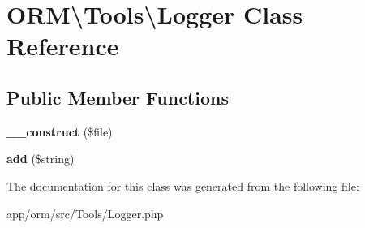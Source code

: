 \hypertarget{classORM_1_1Tools_1_1Logger}{}\section{O\+RM\textbackslash{}Tools\textbackslash{}Logger Class Reference}
\label{classORM_1_1Tools_1_1Logger}
\subsection*{Public Member Functions}
\begin{DoxyCompactItemize}
\item 
{\bfseries \+\_\+\+\_\+construct} (\$file)\hypertarget{classORM_1_1Tools_1_1Logger_aec350111b1a1558fc901226051b26ac7}{}\label{classORM_1_1Tools_1_1Logger_aec350111b1a1558fc901226051b26ac7}

\item 
{\bfseries add} (\$string)\hypertarget{classORM_1_1Tools_1_1Logger_ab25c5234787b2bb913ed62a7f5ea8a2d}{}\label{classORM_1_1Tools_1_1Logger_ab25c5234787b2bb913ed62a7f5ea8a2d}

\end{DoxyCompactItemize}


The documentation for this class was generated from the following file\+:\begin{DoxyCompactItemize}
\item 
app/orm/src/\+Tools/Logger.\+php\end{DoxyCompactItemize}
